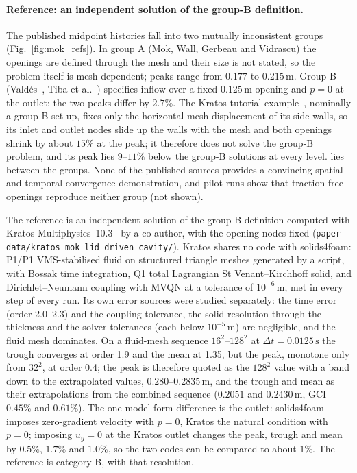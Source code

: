 \paragraph{Reference: an independent solution of the group-B definition.}
The published midpoint histories fall into two mutually inconsistent groups (Fig.~\ref{fig:mok_refs}).
In group A (Mok, Wall, Gerbeau and Vidrascu) the openings are defined through the mesh and their size is not stated, so the problem itself is mesh dependent; peaks range from $0.177$ to $0.215\,\mathrm{m}$.
Group B (Vald\'es~\citep{Valdes2007}, Tiba et al.~\citep{Tiba2026}) specifies inflow over a fixed $0.125\,\mathrm{m}$ opening and $p = 0$ at the outlet; the two peaks differ by $2.7\%$.
The Kratos tutorial example~\citep{KratosLDC}, nominally a group-B set-up, fixes only the horizontal mesh displacement of its side walls, so its inlet and outlet nodes slide up the walls with the mesh and both openings shrink by about $15\%$ at the peak; it therefore does not solve the group-B problem, and its peak lies $9$--$11\%$ below the group-B solutions at every level.
\citet{Kassiotis2011} lies between the groups.
None of the published sources provides a convincing spatial and temporal convergence demonstration, and pilot runs show that traction-free openings reproduce neither group (not shown).

The reference is an independent solution of the group-B definition computed with Kratos Multiphysics~10.3~\citep{Dadvand2010} by a co-author, with the opening nodes fixed (\texttt{paper-data/kratos\_mok\_lid\_driven\_cavity/}).
Kratos shares no code with solids4foam: P1/P1 VMS-stabilised fluid on structured triangle meshes generated by a script, with Bossak time integration, Q1 total Lagrangian St Venant--Kirchhoff solid, and Dirichlet--Neumann coupling with MVQN at a tolerance of $10^{-6}\,\mathrm{m}$, met in every step of every run.
Its own error sources were studied separately: the time error (order 2.0--2.3) and the coupling tolerance, the solid resolution through the thickness and the solver tolerances (each below $10^{-5}\,\mathrm{m}$) are negligible, and the fluid mesh dominates.
On a fluid-mesh sequence $16^2$--$128^2$ at $\Delta t = 0.0125\,\mathrm{s}$ the trough converges at order 1.9 and the mean at 1.35, but the peak, monotone only from $32^2$, at order 0.4; the peak is therefore quoted as the $128^2$ value with a band down to the extrapolated values, $0.280$--$0.2835\,\mathrm{m}$, and the trough and mean as their extrapolations from the combined sequence ($0.2051$ and $0.2430\,\mathrm{m}$, GCI $0.45\%$ and $0.61\%$).
The one model-form difference is the outlet: solids4foam imposes zero-gradient velocity with $p = 0$, Kratos the natural condition with $p = 0$; imposing $u_y = 0$ at the Kratos outlet changes the peak, trough and mean by $0.5\%$, $1.7\%$ and $1.0\%$, so the two codes can be compared to about $1\%$.
The reference is category B, with that resolution.

